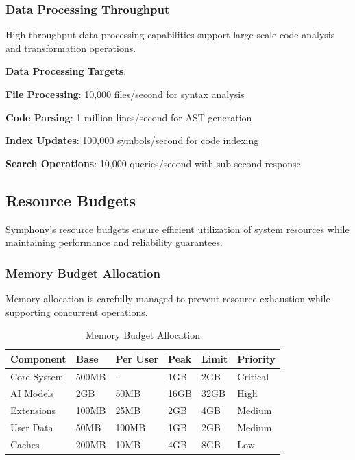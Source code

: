 \subsubsection*{Data Processing Throughput}

High-throughput data processing capabilities support large-scale code analysis and transformation operations.

\textbf{Data Processing Targets}:
\begin{compactlist}
    \item \textbf{File Processing}: 10,000 files/second for syntax analysis
    \item \textbf{Code Parsing}: 1 million lines/second for AST generation
    \item \textbf{Index Updates}: 100,000 symbols/second for code indexing
    \item \textbf{Search Operations}: 10,000 queries/second with sub-second response
\end{compactlist}

\subsection*{Resource Budgets}

Symphony's resource budgets ensure efficient utilization of system resources while maintaining performance and reliability guarantees.

\subsubsection*{Memory Budget Allocation}

Memory allocation is carefully managed to prevent resource exhaustion while supporting concurrent operations.

\begin{table}[h]
\centering
\caption{Memory Budget Allocation}
\label{tab:memory-budget}
\begin{tabular}{@{}llllll@{}}
\toprule
\textbf{Component} & \textbf{Base} & \textbf{Per User} & \textbf{Peak} & \textbf{Limit} & \textbf{Priority} \\
\midrule
Core System & 500MB & - & 1GB & 2GB & Critical \\
AI Models & 2GB & 50MB & 16GB & 32GB & High \\
Extensions & 100MB & 25MB & 2GB & 4GB & Medium \\
User Data & 50MB & 100MB & 1GB & 2GB & Medium \\
Caches & 200MB & 10MB & 4GB & 8GB & Low \\
\bottomrule
\end{tabular}
\end{table}

